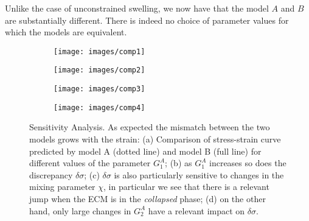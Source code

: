 Unlike the case of unconstrained swelling, we now have that the model $A$ and $B$ are substantially different. There is indeed no choice of parameter values for which the models are equivalent. 

\begin{figure}[h!]
	\begin{subfigure}{0.49\textwidth}
		\texttt{[image: images/comp1]}
		\caption{}
	\end{subfigure}
	\begin{subfigure}{0.49\textwidth}
		\texttt{[image: images/comp2]}
		\caption{}
	\end{subfigure}
	
	\begin{subfigure}{0.49\textwidth}
		\texttt{[image: images/comp3]}
		\caption{}
	\end{subfigure}
	\begin{subfigure}{0.49\textwidth}
		\texttt{[image: images/comp4]}
		\caption{}
	\end{subfigure}
	\caption{Sensitivity Analysis. As expected the mismatch between the two models grows with the strain: (a) Comparison of stress-strain curve predicted by model A (dotted line) and model B (full line) for different values of the parameter $G^A_1$; (b) as $G_1^A$ increases so does the discrepancy $\delta\sigma$; (c) $\delta\sigma$ is also particularly sensitive to changes in the mixing parameter $\chi$, in particular we see that there is a relevant jump when the ECM is in the \textit{collapsed} phase; (d) on the other hand, only large changes in $G^A_2$ have a relevant impact on $\delta\sigma$.}
	\label{comp3}
\end{figure}

